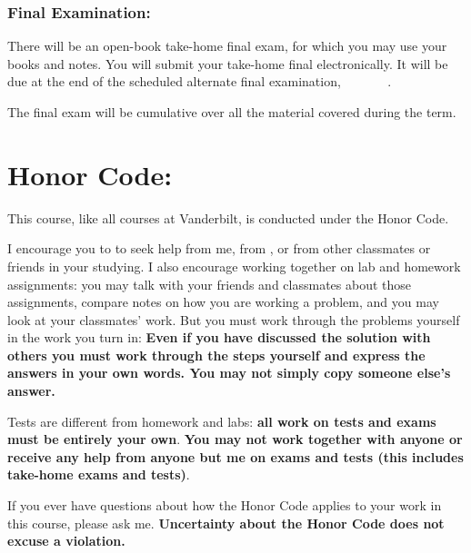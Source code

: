 \documentclass[11pt,twoside]{jgsyllabus}\usepackage[]{graphicx}\usepackage[]{color}
\begin{document}
\subsubsection{Final Examination:}
There will be an open-book take-home final exam, for which you may use your books and notes.
You will submit your take-home final electronically. It will be due at the end
of the scheduled \ifAltFinal alternate \fi final examination,
\ifAltFinal \AltFinalExamEndTime\ \AltFinalExamDay\ \AltFinalExamMonth~\AltFinalExamDate \else
\FinalExamEndTime\ \FinalExamDay\ \FinalExamMonth~\FinalExamDate \fi.
%

The final exam will be cumulative over all the material covered during the term.

\section{Honor Code:}
This course, like all courses at Vanderbilt, is conducted under the Honor Code.

I encourage you to to seek help from me, from \TaTitle,
or from other classmates or friends in your studying. I also encourage working together
on lab and homework assignments: you may talk with your friends and classmates about
those assignments, compare notes on how you are working a problem, and you
may look at your classmates' work.
But you must work through the problems yourself
in the work you turn in: \textbf{Even if you have discussed the solution with others you must
work through the steps yourself and express the answers in your own words. You may not
simply copy someone else's answer.}

Tests are different from homework and labs: \textbf{%
all work on tests and exams must be entirely your own}.
\textbf{You may not work together with anyone or receive any help from anyone but me
on exams and tests (this includes take-home exams and tests)}.

\iffalse
Writing assignments will contain instructions how the honor code applies.
\fi
If you ever
have questions about how the Honor Code applies to your work
in this course, please ask me.
\textbf{Uncertainty about the Honor Code does not excuse a violation.}
\end{document}
